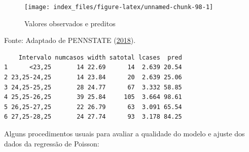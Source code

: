 \documentclass[12pt,brazil,oneside]{book}
\newenvironment{Shaded}{\begin{snugshade}}{\end{snugshade}}
\newcommand{\DataTypeTok}[1]{\textcolor[rgb]{0.13,0.29,0.53}{#1}}
\newcommand{\DecValTok}[1]{\textcolor[rgb]{0.00,0.00,0.81}{#1}}
\newcommand{\KeywordTok}[1]{\textcolor[rgb]{0.13,0.29,0.53}{\textbf{#1}}}
\newcommand{\NormalTok}[1]{#1}
\newcommand{\OperatorTok}[1]{\textcolor[rgb]{0.81,0.36,0.00}{\textbf{#1}}}
\newcommand{\StringTok}[1]{\textcolor[rgb]{0.31,0.60,0.02}{#1}}
\begin{document}
\begin{Shaded}
\end{Shaded}

\begin{figure}[H]

{\centering \texttt{[image: index\_files/figure-latex/unnamed-chunk-98-1]} 

}

\caption{Valores observados e preditos}\label{fig:unnamed-chunk-98}
\end{figure}

Fonte: Adaptado de PENNSTATE (\protect\hyperlink{ref-penn2018}{2018}).

\begin{Shaded}
\end{Shaded}

\begin{verbatim}
    Intervalo numcasos width satotal lcases  pred
1      <23,25       14 22.69      14  2.639 20.54
2 23,25-24,25       14 23.84      20  2.639 25.06
3 24,25-25,25       28 24.77      67  3.332 58.85
4 25,25-26,25       39 25.84     105  3.664 98.61
5 26,25-27,25       22 26.79      63  3.091 65.54
6 27,25-28,25       24 27.74      93  3.178 84.25
\end{verbatim}

Alguns procedimentos usuais para avaliar a qualidade do modelo e ajuste
dos dados da regressão de Poisson:
\end{document}
